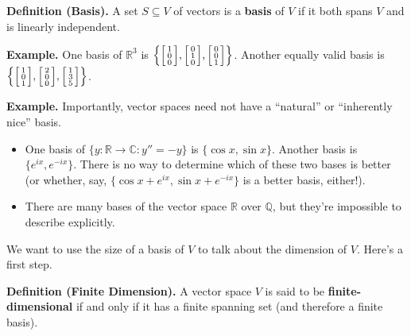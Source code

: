 \textbf{Definition (Basis).} A set $S \subseteq V$ of vectors is a \textbf{basis} of $V$ if it both spans $V$ and is linearly independent.

\textbf{Example.} One basis of $\mathbb{R}^3$ is $\left\{ \begin{bsmallmatrix} 1 \\ 0 \\ 0 \end{bsmallmatrix}, \begin{bsmallmatrix} 0 \\ 1 \\ 0 \end{bsmallmatrix}, \begin{bsmallmatrix} 0 \\ 0 \\ 1 \end{bsmallmatrix} \right \}$.  Another equally valid basis is $\left\{ \begin{bsmallmatrix} 1 \\ 0 \\ 1 \end{bsmallmatrix}, \begin{bsmallmatrix} 2 \\ 0 \\ 0 \end{bsmallmatrix}, \begin{bsmallmatrix} 1 \\ 3 \\ 5 \end{bsmallmatrix} \right \}$.

\textbf{Example.} Importantly, vector spaces need not have a ``natural'' or ``inherently nice'' basis.
\begin{itemize}
    \item One basis of $\{y: \mathbb{R} \to \mathbb{C}: y'' = -y\}$ is $\{ \cos x, \sin x\}$.  Another basis is $\{e^{ix}, e^{-ix}\}$.  There is no way to determine which of these two bases is better (or whether, say, $\{\cos x + e^{ix}, \sin x + e^{-ix}\}$ is a better basis, either!).
    \item There are many bases of the vector space $\mathbb{R}$ over $\mathbb{Q}$, but they're impossible to describe explicitly.
\end{itemize}

We want to use the size of a basis of $V$ to talk about the dimension of $V$.  Here's a first step.

\textbf{Definition (Finite Dimension).} A vector space $V$ is said to be \textbf{finite-dimensional} if and only if it has a finite spanning set (and therefore a finite basis).

